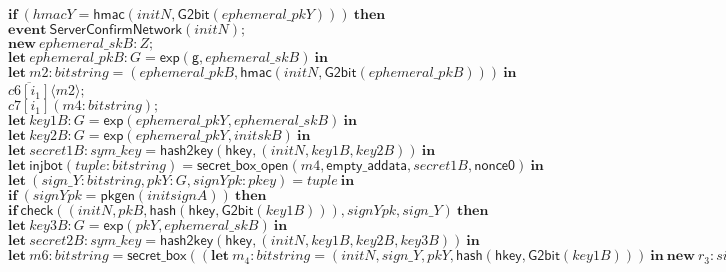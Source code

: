 \documentclass{article}
\newcommand{\cinput}[2]{{#1}({#2})}
\newcommand{\coutput}[2]{\overline{#1}\langle{#2}\rangle}
\newcommand{\kw}[1]{\mathbf{#1}}
\newcommand{\kwf}[1]{\mathsf{#1}}
\newcommand{\var}[1]{\mathit{#1}}
\newcommand{\kwt}[1]{\mathit{#1}}
\newcommand{\kwc}[1]{\mathit{#1}}
\begin{document}
\begin{tabbing}
\>$\quad \kw{if}\ (\var{hmacY}  =  \kwf{hmac}(\var{initN}, \kwf{G2bit}(\var{ephemeral{\_}pkY})))\ \kw{then}$\\
\>$\quad \kw{event}\ \kwf{ServerConfirmNetwork}(\var{initN});$\\
\>$\quad \kw{new}\ \var{ephemeral{\_}skB}: \kwt{Z};$\\
\>$\quad \kw{let}\ \var{ephemeral{\_}pkB}: \kwt{G} = \kwf{exp}(\kwf{g}, \var{ephemeral{\_}skB})\ \kw{in}$\\
\>$\quad \kw{let}\ \var{m2}: \kwt{bitstring} = \kwf{}(\var{ephemeral{\_}pkB}, \kwf{hmac}(\var{initN}, \kwf{G2bit}(\var{ephemeral{\_}pkB})))\ \kw{in}$\\
\>$\quad \coutput{\kwc{c6}[\var{i}_{1}]}{\var{m2}};$\\
\>$\quad \cinput{\kwc{c7}[\var{i}_{1}]}{\var{m4}: \kwt{bitstring}};$\\
\>$\quad \kw{let}\ \var{key1B}: \kwt{G} = \kwf{exp}(\var{ephemeral{\_}pkY}, \var{ephemeral{\_}skB})\ \kw{in}$\\
\>$\quad \kw{let}\ \var{key2B}: \kwt{G} = \kwf{exp}(\var{ephemeral{\_}pkY}, \var{initskB})\ \kw{in}$\\
\>$\quad \kw{let}\ \var{secret1B}: \kwt{sym{\_}key} = \kwf{hash2key}(\kwf{hkey}, \kwf{}(\var{initN}, \var{key1B}, \var{key2B}))\ \kw{in}$\\
\>$\quad \kw{let}\ \kwf{injbot}(\var{tuple}: \kwt{bitstring}) = \kwf{secret{\_}box{\_}open}(\var{m4}, \kwf{empty{\_}addata}, \var{secret1B}, \kwf{nonce0})\ \kw{in}$\\
\>$\quad \kw{let}\ \kwf{}(\var{sign{\_}Y}: \kwt{bitstring}, \var{pkY}: \kwt{G}, \var{signYpk}: \kwt{pkey}) = \var{tuple}\ \kw{in}$\\
\>$\quad \kw{if}\ (\var{signYpk}  =  \kwf{pkgen}(\var{initsignA}))\ \kw{then}$\\
\>$\quad \kw{if}\ \kwf{check}(\kwf{}(\var{initN}, \var{pkB}, \kwf{hash}(\kwf{hkey}, \kwf{G2bit}(\var{key1B}))), \var{signYpk}, \var{sign{\_}Y})\ \kw{then}$\\
\>$\quad \kw{let}\ \var{key3B}: \kwt{G} = \kwf{exp}(\var{pkY}, \var{ephemeral{\_}skB})\ \kw{in}$\\
\>$\quad \kw{let}\ \var{secret2B}: \kwt{sym{\_}key} = \kwf{hash2key}(\kwf{hkey}, \kwf{}(\var{initN}, \var{key1B}, \var{key2B}, \var{key3B}))\ \kw{in}$\\
\>$\quad \kw{let}\ \var{m6}: \kwt{bitstring} = \kwf{secret{\_}box}((\kw{let}\ \var{m}_{4}: \kwt{bitstring} = \kwf{}(\var{initN}, \var{sign{\_}Y}, \var{pkY}, \kwf{hash}(\kwf{hkey}, \kwf{G2bit}(\var{key1B})))\ \kw{in}\ \kw{new}\ \var{r}_{3}: \kwt{sign{\_}seed};\ \kwf{sign{\_}r}(\var{m}_{4}, \var{signBsk}, \var{r}_{3})), \kwf{empty{\_}addata}, \var{secret2B}, \kwf{nonce0})\ \kw{in}$\\

\end{tabbing}
\end{document}
